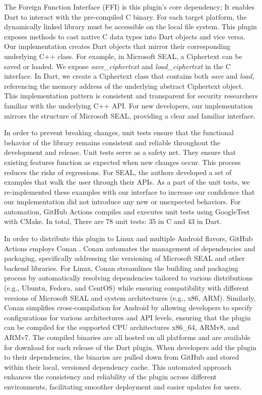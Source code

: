 The Foreign Function Interface (FFI) is this plugin's core dependency; It enables Dart to interact with the pre-compiled C binary. For each target platform, the dynamically linked library must be accessible on the local file system. This plugin exposes methods to cast native C data types into Dart objects and vice versa. Our implementation creates Dart objects that mirror their corresponding underlying C++ class. For example, in Microsoft SEAL, a Ciphertext can be saved or loaded. We expose \textit{save\_ciphertext} and \textit{load\_ciphertext} in the C interface. In Dart, we create a Ciphertext class that contains both \textit{save} and \textit{load}, referencing the memory address of the underlying abstract Ciphertext object. This implementation pattern is consistent and transparent for security researchers familiar with the underlying C++ API. For new developers, our implementation mirrors the structure of Microsoft SEAL, providing a clear and familiar interface.

In order to prevent breaking changes, unit tests ensure that the functional behavior of the library remains consistent and reliable throughout the development and release. Unit tests serve as a safety net. They ensure that existing features function as expected when new changes occur. This process reduces the risks of regressions. For SEAL, the authors developed a set of examples that walk the user through their APIs. As a part of the unit tests, we re-implemented these examples with our interface to increase our confidence that our implementation did not introduce any new or unexpected behaviors. For automation, GitHub Actions compiles and executes unit tests using GoogleTest \cite{GoogleTest} with CMake. In total, There are 78 unit tests: 35 in C and 43 in Dart.

In order to distribute this plugin to Linux and multiple Android flavors, GitHub Actions employs Conan \cite{Conan}. Conan automates the management of dependencies and packaging, specifically addressing the versioning of Microsoft SEAL and other backend libraries. For Linux, Conan streamlines the building and packaging process by automatically resolving dependencies tailored to various distributions (e.g., Ubuntu, Fedora, and CentOS) while ensuring compatibility with different versions of Microsoft SEAL and system architectures (e.g., x86, ARM). Similarly, Conan simplifies cross-compilation for Android by allowing developers to specify configurations for various architectures and API levels, ensuring that the plugin can be compiled for the supported CPU architectures x86\_64, ARMv8, and ARMv7. The compiled binaries are all hosted on all platforms and are available for download for each release of the Dart plugin. When developers add the plugin to their dependencies, the binaries are pulled down from GitHub and stored within their local, versioned dependency cache. This automated approach enhances the consistency and reliability of the plugin across different environments, facilitating smoother deployment and easier updates for users.